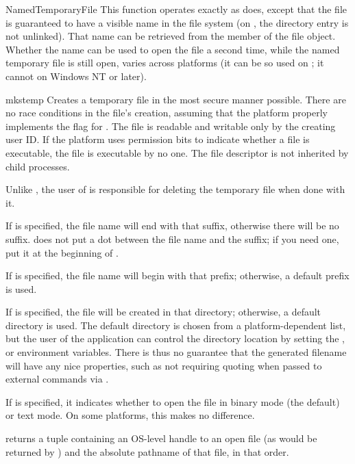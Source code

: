 \begin{funcdesc}{NamedTemporaryFile}{}
This function operates exactly as  does,
except that the file is guaranteed to have a visible name in the file
system (on \UNIX, the directory entry is not unlinked).  That name can
be retrieved from the  member of the file object.  Whether
the name can be used to open the file a second time, while the
named temporary file is still open, varies across platforms (it can
be so used on \UNIX; it cannot on Windows NT or later).
\end{funcdesc}

\begin{funcdesc}{mkstemp}{}
Creates a temporary file in the most secure manner possible.  There
are no race conditions in the file's creation, assuming that the
platform properly implements the  flag for
.  The file is readable and writable only by the
creating user ID.  If the platform uses permission bits to indicate
whether a file is executable, the file is executable by no one.  The
file descriptor is not inherited by child processes.

Unlike , the user of  is
responsible for deleting the temporary file when done with it.

If  is specified, the file name will end with that suffix,
otherwise there will be no suffix.   does not put a
dot between the file name and the suffix; if you need one, put it at
the beginning of .

If  is specified, the file name will begin with that
prefix; otherwise, a default prefix is used.

If  is specified, the file will be created in that directory;
otherwise, a default directory is used.  The default directory is chosen
from a platform-dependent list, but the user of the application can control
the directory location by setting the ,  or 
environment variables.  There is thus no guarantee that the generated
filename will have any nice properties, such as not requiring quoting when
passed to external commands via .

If  is specified, it indicates whether to open the file in
binary mode (the default) or text mode.  On some platforms, this makes
no difference.

 returns a tuple containing an OS-level handle to
an open file (as would be returned by ) and the
absolute pathname of that file, in that order.
\end{funcdesc}

